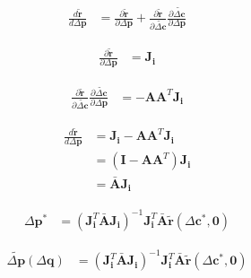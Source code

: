 \begin{equation}
    \begin{aligned}
        \frac{d \tilde{\mathbf{r}}}{d \Delta \mathbf{p}} & = \frac{\partial \tilde{\mathbf{r}}}{\partial \Delta \mathbf{p}} + \frac{\partial \tilde{\mathbf{r}}}{\partial \tilde{\Delta \mathbf{c}}} \frac{\partial \tilde{\Delta \mathbf{c}}}{\partial \Delta \mathbf{p}}
    \label{eq:wiberg_forward}
    \end{aligned}
\end{equation}

\begin{equation}
    \begin{aligned}
        \frac{\partial \tilde{\mathbf{r}}}{\partial \Delta \mathbf{p}} &= \mathbf{J}_{\mathbf{i}}
    \label{eq:wiberg_forward1}
    \end{aligned}
\end{equation}

\begin{equation}
    \begin{aligned}
        \frac{\partial \tilde{\mathbf{r}}}{\partial \tilde{\Delta \mathbf{c}}} \frac{\partial \tilde{\Delta \mathbf{c}}}{\partial \Delta \mathbf{p}} & = - \mathbf{A}\mathbf{A}^T\mathbf{J}_{\mathbf{i}}
    \label{eq:wiberg_forward2}
    \end{aligned}
\end{equation}

\begin{equation}
    \begin{aligned}
        \frac{d \tilde{\mathbf{r}}}{d \Delta \mathbf{p}} & = \mathbf{J}_{\mathbf{i}} - \mathbf{A} \mathbf{A}^T \mathbf{J}_{\mathbf{i}}
        \\
        & = (\mathbf{I} - \mathbf{A} \mathbf{A}^T) \mathbf{J}_{\mathbf{i}}
        \\
        & = \bar{\mathbf{A}} \mathbf{J}_{\mathbf{i}}
    \label{eq:wiberg_forward}
    \end{aligned}
\end{equation}

\begin{equation}
    \begin{aligned}
        \Delta \mathbf{p}^* & = \left( \mathbf{J}_{\mathbf{i}}^T \bar{\mathbf{A}} \mathbf{J}_{\mathbf{i}} \right)^{-1} \mathbf{J}_{\mathbf{i}}^T \bar{\mathbf{A}} \tilde{\mathbf{r}}(\Delta\mathbf{c}^*, \mathbf{0})
    \label{eq:wiberg_appearance}
    \end{aligned}
\end{equation}

\begin{equation}
    \begin{aligned}
        \tilde{\Delta \mathbf{p}}(\Delta \mathbf{q}) & = \left( \mathbf{J}_{\mathbf{i}}^T \bar{\mathbf{A}} \mathbf{J}_{\mathbf{i}} \right)^{-1} \mathbf{J}_{\mathbf{i}}^T \bar{\mathbf{A}} \tilde{\mathbf{r}}(\Delta\mathbf{c}^*, \mathbf{0})
    \label{eq:wiberg_appearance}
    \end{aligned}
\end{equation}

